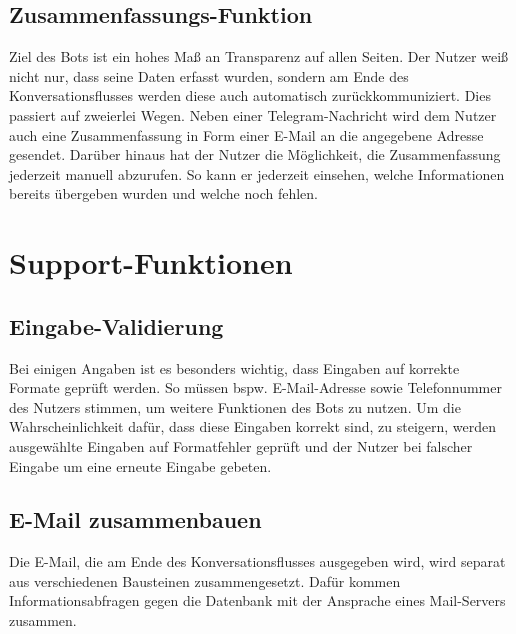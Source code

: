         \subsection{Zusammenfassungs-Funktion}
            Ziel des Bots ist ein hohes Maß an Transparenz auf allen Seiten. Der Nutzer weiß nicht nur, dass seine Daten erfasst wurden, sondern am Ende des Konversationsflusses werden diese auch automatisch zurückkommuniziert. Dies passiert auf zweierlei Wegen. Neben einer Telegram-Nachricht wird dem Nutzer auch eine Zusammenfassung in Form einer E-Mail an die angegebene Adresse gesendet. Darüber hinaus hat der Nutzer die Möglichkeit, die Zusammenfassung jederzeit manuell abzurufen. So kann er jederzeit einsehen, welche Informationen bereits übergeben wurden und welche noch fehlen.

            
    \section{Support-Funktionen}
        
        \subsection{Eingabe-Validierung}
        Bei einigen Angaben ist es besonders wichtig, dass Eingaben auf korrekte Formate geprüft werden. So müssen bspw. E-Mail-Adresse sowie Telefonnummer des Nutzers stimmen, um weitere Funktionen des Bots zu nutzen. Um die Wahrscheinlichkeit dafür, dass diese Eingaben korrekt sind, zu steigern, werden ausgewählte Eingaben auf Formatfehler geprüft und der Nutzer bei falscher Eingabe um eine erneute Eingabe gebeten.
        
        \subsection{E-Mail zusammenbauen}
        Die E-Mail, die am Ende des Konversationsflusses ausgegeben wird, wird separat aus verschiedenen Bausteinen zusammengesetzt. Dafür kommen Informationsabfragen gegen die Datenbank mit der Ansprache eines Mail-Servers zusammen.
        
    
